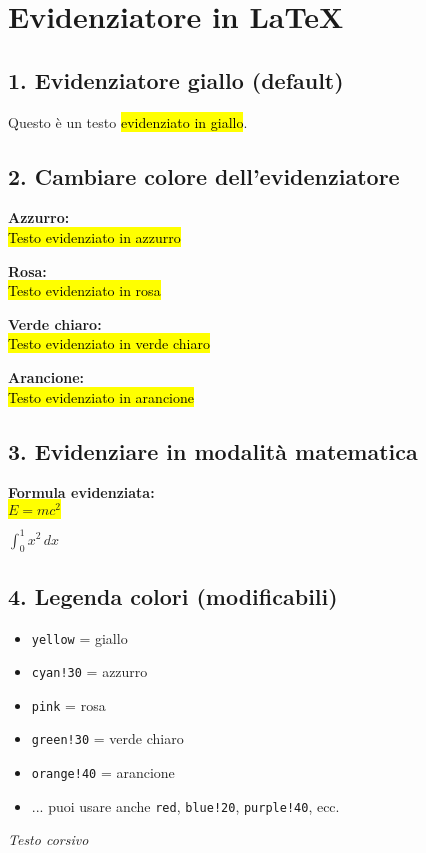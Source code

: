 \section*{Evidenziatore in LaTeX}

\subsection*{1. Evidenziatore giallo (default)}
Questo è un testo \hl{evidenziato in giallo}.

\subsection*{2. Cambiare colore dell'evidenziatore}

\textbf{Azzurro:}\\
{\hl{Testo evidenziato in azzurro}}

\vspace{5pt}
\textbf{Rosa:}\\
{\hl{Testo evidenziato in rosa}}

\vspace{5pt}
\textbf{Verde chiaro:}\\
{\hl{Testo evidenziato in verde chiaro}}

\vspace{5pt}
\textbf{Arancione:}\\
{\hl{Testo evidenziato in arancione}}

\subsection*{3. Evidenziare in modalità matematica}

\textbf{Formula evidenziata:}\\
\colorbox{yellow}{$E = mc^2$}

\vspace{5pt}
\colorbox{cyan!30}{$\int_0^1 x^2\,dx$}

\subsection*{4. Legenda colori (modificabili)}

\begin{itemize}
  \item \texttt{yellow} = giallo
  \item \texttt{cyan!30} = azzurro
  \item \texttt{pink} = rosa
  \item \texttt{green!30} = verde chiaro
  \item \texttt{orange!40} = arancione
  \item ... puoi usare anche \texttt{red}, \texttt{blue!20}, \texttt{purple!40}, ecc.

  
\end{itemize}

\textit{Testo corsivo}